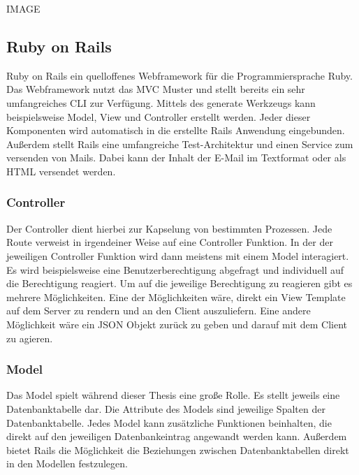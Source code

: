 \documentclass[11pt]{article}
\newcommand{\hlnote}[2]{#1}
\newcommand{\hlnote}[2]{\todo{#2}\texthl{#1}}
\begin{document}
\begin{flushleft}
			IMAGE


			\subsection{Ruby on Rails}
			\label{sec: rails}
			Ruby on Rails ein quelloffenes Webframework für die Programmiersprache Ruby. Das Webframework nutzt das MVC Muster und stellt bereits ein sehr umfangreiches CLI zur Verfügung. \hlnote{Mittels des generate Werkzeugs kann beispielsweise Model, View und Controller erstellt werden. Jeder dieser Komponenten wird automatisch in die erstellte Rails Anwendung eingebunden.}{Wo brauchst du das?} Außerdem stellt Rails eine umfangreiche Test-Architektur und einen Service zum versenden von Mails. Dabei kann der Inhalt der E-Mail im Textformat oder als HTML versendet werden.


			\subsubsection{Controller}
			\label{sec: rails_controller}
			Der Controller dient hierbei zur Kapselung von bestimmten Prozessen. Jede Route verweist in irgendeiner Weise auf eine Controller Funktion. In der der jeweiligen Controller Funktion wird dann meistens mit einem Model interagiert. Es wird beispielsweise eine Benutzerberechtigung abgefragt und individuell auf die Berechtigung reagiert. Um auf die jeweilige Berechtigung zu reagieren gibt es mehrere Möglichkeiten. Eine der Möglichkeiten wäre, direkt ein View Template auf dem Server zu rendern und an den Client auszuliefern. Eine andere Möglichkeit wäre ein JSON Objekt zurück zu geben und darauf mit dem Client zu agieren.

			\subsubsection{Model}
			\label{sec: rails_model}
			Das Model spielt während dieser Thesis \hlnote{eine große Rolle}{weasel}. Es stellt jeweils eine Datenbanktabelle dar. Die Attribute des Models sind jeweilige Spalten der Datenbanktabelle. Jedes Model kann zusätzliche Funktionen beinhalten, die direkt auf den jeweiligen Datenbankeintrag angewandt werden kann. Außerdem bietet Rails die Möglichkeit die Beziehungen zwischen Datenbanktabellen direkt in den Modellen festzulegen.


\end{flushleft}
\end{document}
